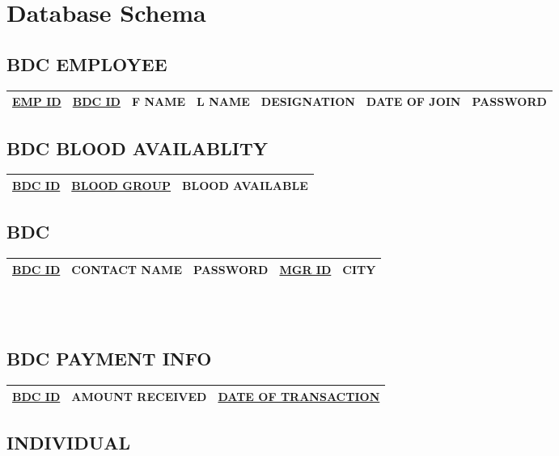 \begin{sloppypar}
\section{Database Schema}

\subsection{BDC EMPLOYEE}

\begin{tabular}{ | c | c | c | c | c | c | c | }
 \hline
 \underline{EMP ID} & \underline{BDC ID} & F NAME & L NAME & DESIGNATION & DATE OF JOIN & PASSWORD \\
 \hline
\end{tabular}

\subsection{BDC BLOOD AVAILABLITY}

\begin{tabular}{ | c | c | c | }
 \hline
 \underline{BDC ID} & \underline{BLOOD GROUP} & BLOOD AVAILABLE \\
 \hline
\end{tabular}

\subsection{BDC}

\begin{tabular}{ | c | c | c | c | c | }
 \hline
 \underline{BDC ID} & CONTACT NAME & PASSWORD & \underline{MGR ID} & CITY \\
 \hline
\end{tabular} \\ \\

\subsection{BDC PAYMENT INFO}

\begin{tabular}{ | c | c | c | }
 \hline
 \underline{BDC ID} & AMOUNT RECEIVED & \underline{DATE OF TRANSACTION} \\
 \hline
\end{tabular}

\subsection{INDIVIDUAL}


\end{sloppypar}
